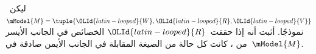 \documentclass[../../../include/open-logic-section]{subfiles}
\begin{document}
\begin{prob}
  ليكن~$\mModel{M} = \tuple{{\OLId{latin-looped}{W}}, {\OLId{latin-looped}{R}}, {\OLId{latin-looped}{V}}}$ نموذجًا. أثبت أنه إذا حققت~${\OLId{latin-looped}{R}}$
  الخصائص في الجانب الأيسر من
  ، كانت كل حالة من الصيغة
  المقابلة في الجانب الأيمن صادقة في~$\mModel{M}$.
\end{prob}
\end{document}
